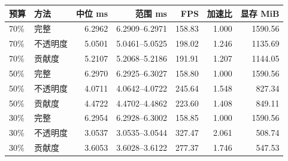\begin{center}
\small
\begin{tabular}{llrrrrr}
\toprule
预算 & 方法 & 中位 ms & 范围 ms & FPS & 加速比 & 显存 MiB \\
\midrule
70\% & 完整 & 6.2962 & 6.2909--6.2971 & 158.83 & 1.000 & 1590.56 \\
70\% & 不透明度 & 5.0501 & 5.0461--5.0525 & 198.02 & 1.246 & 1135.69 \\
70\% & 贡献度 & 5.2107 & 5.2068--5.2186 & 191.91 & 1.207 & 1144.05 \\
50\% & 完整 & 6.2970 & 6.2925--6.3027 & 158.80 & 1.000 & 1590.56 \\
50\% & 不透明度 & 4.0711 & 4.0642--4.0722 & 245.64 & 1.548 & 827.34 \\
50\% & 贡献度 & 4.4722 & 4.4702--4.4862 & 223.60 & 1.408 & 849.11 \\
30\% & 完整 & 6.2954 & 6.2928--6.3002 & 158.85 & 1.000 & 1590.56 \\
30\% & 不透明度 & 3.0537 & 3.0535--3.0544 & 327.47 & 2.061 & 508.74 \\
30\% & 贡献度 & 3.6053 & 3.6028--3.6122 & 277.37 & 1.746 & 547.53 \\
\bottomrule
\end{tabular}
\end{center}
